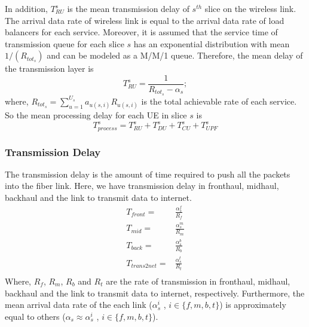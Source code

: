 \documentclass[conference]{IEEEtran}
\begin{document}
In addition, $T_{RU}^{s}$ is the mean transmission delay of $s^{th}$ slice on the wireless link. The arrival data rate of wireless link is equal to the arrival data rate of load balancers for each service.
Moreover, it is assumed that the service time of transmission queue for each slice $s$ has
 an exponential distribution with mean $1/(R_{{tot}_s})$ and can be modeled as a M/M/1 queue.
 Therefore,
the mean delay of the transmission layer is
\begin{equation}
 T_{RU}^{s} = \frac{1}{R_{{tot}_s} - \alpha_{s}};
\end{equation}
where, $R_{{tot}_s} = \sum_{u=1}^{U_s}a_{u(s,i)}R_{u(s,i)}$ is the total achievable rate of each service.
So the mean processing delay for each UE in slice $s$ is 
\begin{equation}
T_{process}^{s} =  T_{RU}^{s} + T_{DU}^{s} + T_{CU}^{s} + T_{UPF}^{s}
\end{equation}
\subsubsection{Transmission Delay}
The transmission delay is the amount of time required to push all the packets into the fiber link. 
Here, we have transmission delay in fronthaul, midhaul, backhaul and the link to transmit data to internet.
\begin{equation}
\begin{split}
T_{front} =& \frac{\alpha_{s}^{f}}{R_f} \\
T_{mid} =&  \frac{\alpha_{s}^{m}}{R_m} \\
T_{back} =& \frac{\alpha_{s}^{b}}{R_b} \\
T_{trans2net} =& \frac{\alpha_{s}^{t}}{R_t} \\
\end{split}
\end{equation}
Where, $R_f$, $R_m$, $R_b$ and $R_t$ are the rate of transmission in fronthaul, midhaul, backhaul and the link to transmit data to internet, respectively.
Furthermore, the mean arrival data rate of the each link ($\alpha_{s}^i$ , $i \in \{f,m,b,t\}$) is approximately equal to others ($\alpha_{s} \approx \alpha_{s}^i$ , $i \in \{f,m,b,t\}$).  
\end{document}

